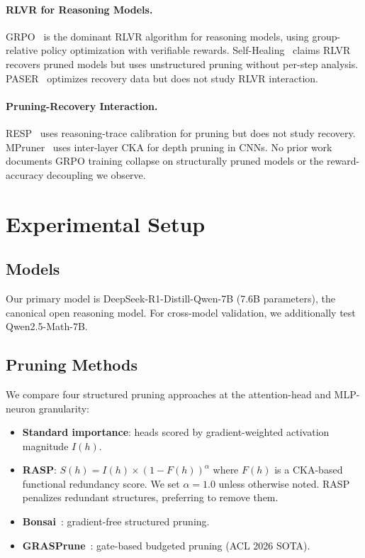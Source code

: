 \documentclass[11pt,a4paper]{article}
\begin{document}
\paragraph{RLVR for Reasoning Models.}
GRPO~\cite{shao2024deepseekmath} is the dominant RLVR algorithm for reasoning models, using group-relative policy optimization with verifiable rewards. Self-Healing~\cite{selfhealing2025} claims RLVR recovers pruned models but uses unstructured pruning without per-step analysis. PASER~\cite{paser2025} optimizes recovery data but does not study RLVR interaction.

\paragraph{Pruning-Recovery Interaction.}
RESP~\cite{resp2025} uses reasoning-trace calibration for pruning but does not study recovery. MPruner~\cite{mpruner2024} uses inter-layer CKA for depth pruning in CNNs. No prior work documents GRPO training collapse on structurally pruned models or the reward-accuracy decoupling we observe.

\section{Experimental Setup}
\label{sec:setup}

\subsection{Models}
Our primary model is DeepSeek-R1-Distill-Qwen-7B (7.6B parameters), the canonical open reasoning model. For cross-model validation, we additionally test Qwen2.5-Math-7B.

\subsection{Pruning Methods}
We compare four structured pruning approaches at the attention-head and MLP-neuron granularity:

\begin{itemize}
\item \textbf{Standard importance}: heads scored by gradient-weighted activation magnitude $I(h)$.
\item \textbf{RASP}: $S(h) = I(h) \times (1 - F(h))^{\alpha}$ where $F(h)$ is a CKA-based functional redundancy score. We set $\alpha=1.0$ unless otherwise noted. RASP penalizes redundant structures, preferring to remove them.
\item \textbf{Bonsai}~\cite{bonsai2025}: gradient-free structured pruning.
\item \textbf{GRASPrune}~\cite{graspune2026}: gate-based budgeted pruning (ACL 2026 SOTA).
\end{itemize}
\end{document}
